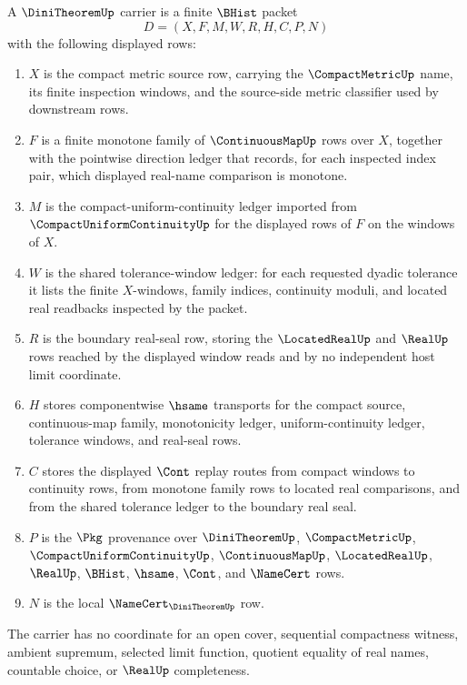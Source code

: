 \begin{definition}\label{def:dini-theorem-carrier}
A $\DiniTheoremUp$ carrier is a finite $\BHist$ packet
$$
D=(X,F,M,W,R,H,C,P,N)
$$
with the following displayed rows:
\begin{enumerate}
\item $X$ is the compact metric source row, carrying the $\CompactMetricUp$ name, its finite inspection windows, and the source-side metric classifier used by downstream rows.
\item $F$ is a finite monotone family of $\ContinuousMapUp$ rows over $X$, together with the pointwise direction ledger that records, for each inspected index pair, which displayed real-name comparison is monotone.
\item $M$ is the compact-uniform-continuity ledger imported from $\CompactUniformContinuityUp$ for the displayed rows of $F$ on the windows of $X$.
\item $W$ is the shared tolerance-window ledger: for each requested dyadic tolerance it lists the finite $X$-windows, family indices, continuity moduli, and located real readbacks inspected by the packet.
\item $R$ is the boundary real-seal row, storing the $\LocatedRealUp$ and $\RealUp$ rows reached by the displayed window reads and by no independent host limit coordinate.
\item $H$ stores componentwise $\hsame$ transports for the compact source, continuous-map family, monotonicity ledger, uniform-continuity ledger, tolerance windows, and real-seal rows.
\item $C$ stores the displayed $\Cont$ replay routes from compact windows to continuity rows, from monotone family rows to located real comparisons, and from the shared tolerance ledger to the boundary real seal.
\item $P$ is the $\Pkg$ provenance over $\DiniTheoremUp$, $\CompactMetricUp$, $\CompactUniformContinuityUp$, $\ContinuousMapUp$, $\LocatedRealUp$, $\RealUp$, $\BHist$, $\hsame$, $\Cont$, and $\NameCert$ rows.
\item $N$ is the local $\NameCert_{\DiniTheoremUp}$ row.
\end{enumerate}
The carrier has no coordinate for an open cover, sequential compactness witness, ambient supremum, selected limit function, quotient equality of real names, countable choice, or $\RealUp$ completeness.
\end{definition}

